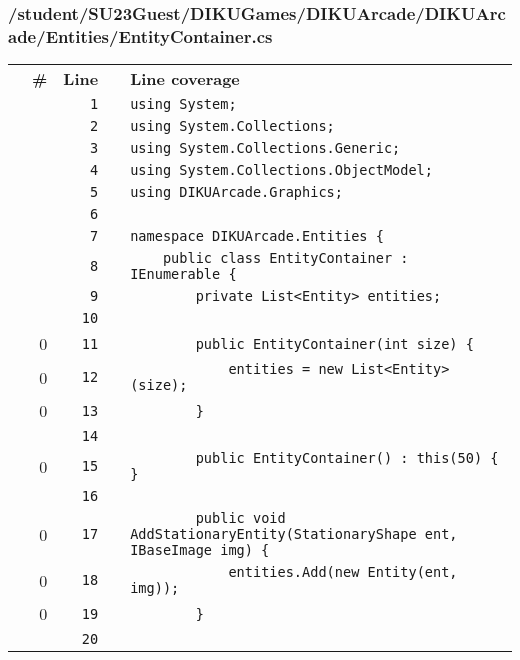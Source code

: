 \documentclass[a4paper,landscape,10pt]{article}
\begin{document}
\subsubsection{/student/SU23Guest/DIKUGames/DIKUArcade/DIKUArcade/Entities/EntityContainer.cs}
\begin{longtable}[l]{lrrll}
\textbf{} & \textbf{\#} & \textbf{Line} & \textbf{} & \textbf{Line coverage}\\
\cellcolor{gray} &  & \verb~1~ & & \verb~using System;~\\
\cellcolor{gray} &  & \verb~2~ & & \verb~using System.Collections;~\\
\cellcolor{gray} &  & \verb~3~ & & \verb~using System.Collections.Generic;~\\
\cellcolor{gray} &  & \verb~4~ & & \verb~using System.Collections.ObjectModel;~\\
\cellcolor{gray} &  & \verb~5~ & & \verb~using DIKUArcade.Graphics;~\\
\cellcolor{gray} &  & \verb~6~ & & \verb~~\\
\cellcolor{gray} &  & \verb~7~ & & \verb~namespace DIKUArcade.Entities {~\\
\cellcolor{gray} &  & \verb~8~ & & \verb~    public class EntityContainer : IEnumerable {~\\
\cellcolor{gray} &  & \verb~9~ & & \verb~        private List<Entity> entities;~\\
\cellcolor{gray} &  & \verb~10~ & & \verb~~\\
\cellcolor{red} & 0 & \verb~11~ & & \verb~        public EntityContainer(int size) {~\\
\cellcolor{red} & 0 & \verb~12~ & & \verb~            entities = new List<Entity>(size);~\\
\cellcolor{red} & 0 & \verb~13~ & & \verb~        }~\\
\cellcolor{gray} &  & \verb~14~ & & \verb~~\\
\cellcolor{red} & 0 & \verb~15~ & & \verb~        public EntityContainer() : this(50) { }~\\
\cellcolor{gray} &  & \verb~16~ & & \verb~~\\
\cellcolor{red} & 0 & \verb~17~ & & \verb~        public void AddStationaryEntity(StationaryShape ent, IBaseImage img) {~\\
\cellcolor{red} & 0 & \verb~18~ & & \verb~            entities.Add(new Entity(ent, img));~\\
\cellcolor{red} & 0 & \verb~19~ & & \verb~        }~\\
\cellcolor{gray} &  & \verb~20~ & & \verb~~\\

\end{longtable}
\end{document}
